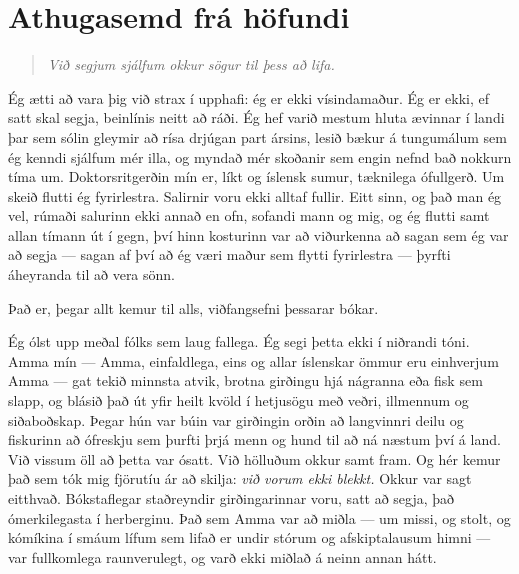 \chapter*{Athugasemd frá höfundi}
{} %

\begin{quote}%
\centerline{\emph{Við segjum sjálfum okkur sögur til þess að lifa.}}
%
\end{quote}

Ég ætti að vara þig við strax í upphafi: ég er ekki vísindamaður. Ég er ekki, ef satt skal segja, beinlínis neitt að ráði. Ég hef varið mestum hluta ævinnar í landi þar sem sólin gleymir að rísa drjúgan part ársins, lesið bækur á tungumálum sem ég kenndi sjálfum mér illa, og myndað mér skoðanir sem engin nefnd bað nokkurn tíma um. Doktorsritgerðin mín er, líkt og íslensk sumur, tæknilega ófullgerð. Um skeið flutti ég fyrirlestra. Salirnir voru ekki alltaf fullir. Eitt sinn, og það man ég vel, rúmaði salurinn ekki annað en ofn, sofandi mann og mig, og ég flutti samt allan tímann út í gegn, því hinn kosturinn var að viðurkenna að sagan sem ég var að segja — sagan af því að ég væri maður sem flytti fyrirlestra — þyrfti áheyranda til að vera sönn.

Það er, þegar allt kemur til alls, viðfangsefni þessarar bókar.

Ég ólst upp meðal fólks sem laug fallega. Ég segi þetta ekki í niðrandi tóni. Amma mín — Amma, einfaldlega, eins og allar íslenskar ömmur eru einhverjum Amma — gat tekið minnsta atvik, brotna girðingu hjá nágranna eða fisk sem slapp, og blásið það út yfir heilt kvöld í hetjusögu með veðri, illmennum og siðaboðskap. Þegar hún var búin var girðingin orðin að langvinnri deilu og fiskurinn að ófreskju sem þurfti þrjá menn og hund til að ná næstum því á land. Við vissum öll að þetta var ósatt. Við hölluðum okkur samt fram. Og hér kemur það sem tók mig fjörutíu ár að skilja: \emph{við vorum ekki blekkt.} Okkur var sagt eitthvað. Bókstaflegar staðreyndir girðingarinnar voru, satt að segja, það ómerkilegasta í herberginu. Það sem Amma var að miðla — um missi, og stolt, og kómíkina í smáum lífum sem lifað er undir stórum og afskiptalausum himni — var fullkomlega raunverulegt, og varð ekki miðlað á neinn annan hátt.

